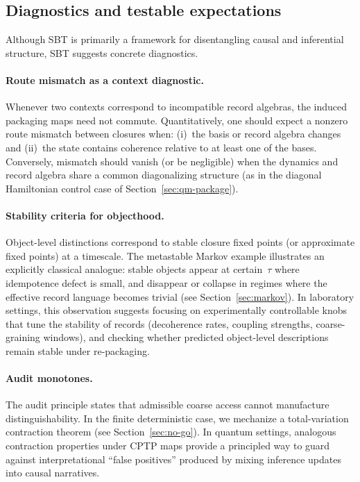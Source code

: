 \documentclass[11pt]{article}
\begin{document}
\subsection{Diagnostics and testable expectations}

Although SBT is primarily a framework for disentangling causal and inferential structure, SBT suggests concrete diagnostics.

\paragraph{Route mismatch as a context diagnostic.}
Whenever two contexts correspond to incompatible record algebras, the induced packaging maps need not commute.
Quantitatively, one should expect a nonzero route mismatch between closures when:
(i)~the basis or record algebra changes and
(ii)~the state contains coherence relative to at least one of the bases.
Conversely, mismatch should vanish (or be negligible) when the dynamics and record algebra share a common diagonalizing structure (as in the diagonal Hamiltonian control case of Section~\ref{sec:qm-package}).

\paragraph{Stability criteria for objecthood.}
Object-level distinctions correspond to stable closure fixed points (or approximate fixed points) at a timescale.
The metastable Markov example illustrates an explicitly classical analogue: stable objects appear at certain~$\tau$ where idempotence defect is small, and disappear or collapse in regimes where the effective record language becomes trivial (see Section~\ref{sec:markov}).
In laboratory settings, this observation suggests focusing on experimentally controllable knobs that tune the stability of records (decoherence rates, coupling strengths, coarse-graining windows), and checking whether predicted object-level descriptions remain stable under re-packaging.

\paragraph{Audit monotones.}
The audit principle states that admissible coarse access cannot manufacture distinguishability.
In the finite deterministic case, we mechanize a total-variation contraction theorem (see Section~\ref{sec:no-go}).
In quantum settings, analogous contraction properties under CPTP maps provide a principled way to guard against interpretational ``false positives'' produced by mixing inference updates into causal narratives.
\end{document}
